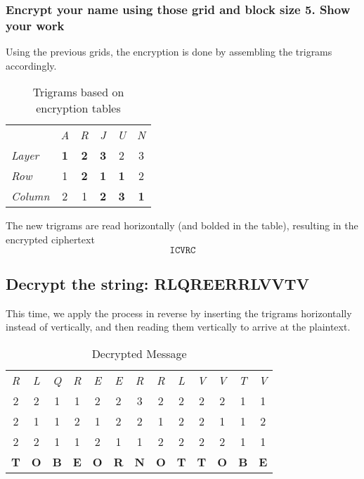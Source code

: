 \subsubsection{Encrypt your name using those grid and block size 5. Show your work}

Using the previous grids, the encryption is done by assembling the trigrams accordingly.

\begin{table}[H]
	\centering
	\caption{Trigrams based on encryption tables}
	\begin{tabular}{lccccc}
					& \textit{A} & \textit{R} & \textit{J} & \textit{U} & \textit{N} \\
	\textit{Layer}   & \textbf{1} & \textbf{2} & \textbf{3} & 2          & 3          \\
	\textit{Row}    & 1          & \textbf{2} & \textbf{1} & \textbf{1} & 2          \\
	\textit{Column} & 2          & 1          & \textbf{2} & \textbf{3} & \textbf{1}
	\end{tabular}
	\end{table}

The new trigrams are read horizontally (and bolded in the table), resulting in the encrypted ciphertext
\[ \mathtt{ICVRC} \]

\subsection{Decrypt the string: RLQREERRLVVTV}

This time, we apply the process in reverse by inserting the trigrams horizontally instead of vertically, and then reading them vertically to arrive at the plaintext.

\begin{table}[H]
	\centering
	\caption{Decrypted Message}
	\begin{tabular}{ccccccccccccc}
	\textit{R} & \textit{L} & \textit{Q} & \textit{R} & \textit{E} & \textit{E} & \textit{R} & \textit{R} & \textit{L} & \textit{V} & \textit{V} & \textit{T} & \textit{V} \\
	2          & 2          & 1          & 1          & 2          & 2          & 3          & 2          & 2          & 2          & 2          & 1          & 1          \\
	2          & 1          & 1          & 2          & 1          & 2          & 2          & 1          & 2          & 2          & 1          & 1          & 2          \\
	2          & 2          & 1          & 1          & 2          & 1          & 1          & 2          & 2          & 2          & 2          & 1          & 1          \\
	\textbf{T} & \textbf{O} & \textbf{B} & \textbf{E} & \textbf{O} & \textbf{R} & \textbf{N} & \textbf{O} & \textbf{T} & \textbf{T} & \textbf{O} & \textbf{B} & \textbf{E}
	\end{tabular}
	\end{table}

